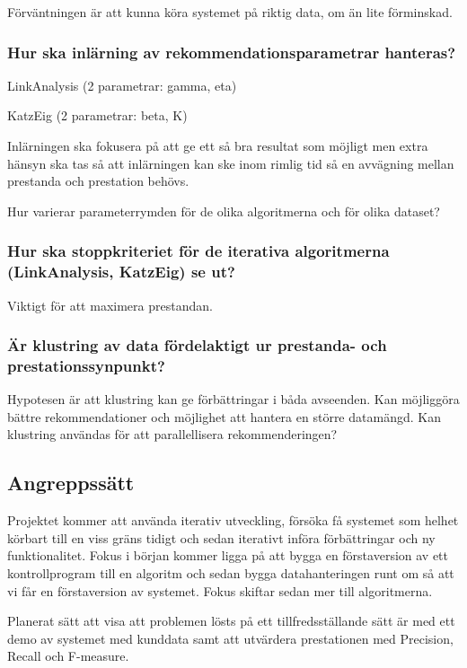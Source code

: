 \documentclass[11pt]{article}
\begin{document}
Förväntningen är att kunna köra systemet på riktig data, om än lite förminskad.


\subsubsection*{Hur ska inlärning av rekommendationsparametrar hanteras?}

LinkAnalysis (2 parametrar: gamma, eta)

KatzEig (2 parametrar: beta, K)

Inlärningen ska fokusera på att ge ett så bra resultat som möjligt men extra hänsyn ska tas så att inlärningen kan ske inom rimlig tid så en avvägning mellan prestanda och prestation behövs.

Hur varierar parameterrymden för de olika algoritmerna och för olika dataset?


\subsubsection*{Hur ska stoppkriteriet för de iterativa algoritmerna (LinkAnalysis, KatzEig) se ut?}

Viktigt för att maximera prestandan.


\subsubsection*{Är klustring av data fördelaktigt ur prestanda- och prestationssynpunkt?}

Hypotesen är att klustring kan ge förbättringar i båda avseenden. Kan möjliggöra bättre rekommendationer och möjlighet att hantera en större datamängd. Kan klustring användas för att parallellisera rekommenderingen?


\subsection*{Angreppssätt}

Projektet kommer att använda iterativ utveckling, försöka få systemet som helhet körbart till en viss gräns tidigt och sedan iterativt införa förbättringar och ny funktionalitet. Fokus i början kommer ligga på att bygga en förstaversion av ett kontrollprogram till en algoritm och sedan bygga datahanteringen runt om så att vi får en förstaversion av systemet. Fokus skiftar sedan mer till algoritmerna.

Planerat sätt att visa att problemen lösts på ett tillfredsställande sätt är med ett demo av systemet med kunddata samt att utvärdera prestationen med Precision, Recall och F-measure.
\end{document}
